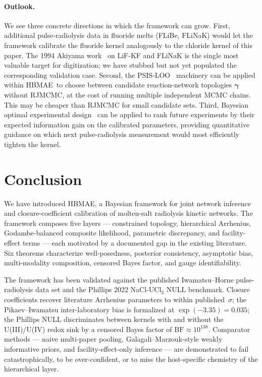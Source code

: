 \documentclass[12pt]{article}
\theoremstyle{plain}
\theoremstyle{definition}
\theoremstyle{remark}
\newcommand{\HBMAE}{HBMAE\xspace}
\begin{document}
\paragraph{Outlook.}  We see three concrete directions in which the
framework can grow.  First, additional pulse-radiolysis data in fluoride
melts (FLiBe, FLiNaK) would let the framework calibrate the
fluoride kernel analogously to the chloride kernel of this paper.
The 1994 Akiyama work~\citep{Akiyama1994} on LiF-KF and FLiNaK is the
single most valuable target for digitization; we have stubbed but not yet
populated the corresponding validation case.  Second, the
PSIS-LOO~\citep{Vehtari2017} machinery can be applied within \HBMAE\ to
choose between candidate reaction-network topologies $\boldsymbol\gamma$
without RJMCMC, at the cost of running multiple independent MCMC chains.
This may be cheaper than RJMCMC for small candidate sets.  Third, Bayesian
optimal experimental design~\citep{Foster2021} can be applied to rank
future experiments by their expected information gain on the calibrated
parameters, providing quantitative guidance on which next pulse-radiolysis
measurement would most efficiently tighten the kernel.

\section{Conclusion}\label{sec:conclusion}

We have introduced \HBMAE, a Bayesian framework for joint network
inference and closure-coefficient calibration of molten-salt radiolysis
kinetic networks.  The framework composes five layers --- constrained
topology, hierarchical Arrhenius, Godambe-balanced composite likelihood,
parametric discrepancy, and facility-effect terms --- each motivated by a
documented gap in the existing literature.  Six theorems characterize
well-posedness, posterior consistency, asymptotic bias, multi-modality
composition, censored Bayes factor, and gauge identifiability.

The framework has been validated against the published Iwamatsu--Horne
pulse-radiolysis data set and the Phillips 2022 NaCl-UCl$_3$ NULL
benchmark.  Closure coefficients recover literature Arrhenius parameters
to within published~$\sigma$; the Pikaev--Iwamatsu inter-laboratory bias
is formalized at $\exp(-3.35) = 0.035$; the Phillips NULL discriminates
between kernels with and without the U(III)/U(IV) redox sink by a censored
Bayes factor of $\mathrm{BF}\approx 10^{138}$.  Comparator methods --- naive
multi-paper pooling, Galagali--Marzouk-style weakly informative priors,
and facility-effect-only inference --- are demonstrated to fail
catastrophically, to be over-confident, or to miss the host-specific
chemistry of the hierarchical layer.
\end{document}
